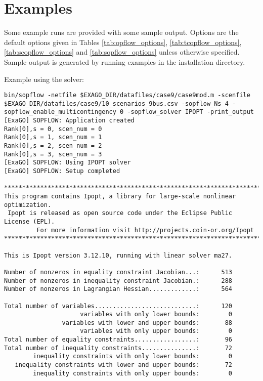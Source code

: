 \section{Examples}
Some \sopflow example runs are provided with some sample output. Options are the default options given in Tables \ref{tab:opflow_options}, \ref{tab:tcopflow_options}, \ref{tab:scopflow_options} and \ref{tab:sopflow_options} unless otherwise specified. Sample output is generated by running examples in the installation directory.

Example using the \ipopt solver:

\begin{lstlisting}
bin/sopflow -netfile $EXAGO_DIR/datafiles/case9/case9mod.m -scenfile $EXAGO_DIR/datafiles/case9/10_scenarios_9bus.csv -sopflow_Ns 4 -sopflow_enable_multicontingency 0 -sopflow_solver IPOPT -print_output
[ExaGO] SOPFLOW: Application created
Rank[0],s = 0, scen_num = 0
Rank[0],s = 1, scen_num = 1
Rank[0],s = 2, scen_num = 2
Rank[0],s = 3, scen_num = 3
[ExaGO] SOPFLOW: Using IPOPT solver
[ExaGO] SOPFLOW: Setup completed

******************************************************************************
This program contains Ipopt, a library for large-scale nonlinear optimization.
 Ipopt is released as open source code under the Eclipse Public License (EPL).
         For more information visit http://projects.coin-or.org/Ipopt
******************************************************************************

This is Ipopt version 3.12.10, running with linear solver ma27.

Number of nonzeros in equality constraint Jacobian...:      513
Number of nonzeros in inequality constraint Jacobian.:      288
Number of nonzeros in Lagrangian Hessian.............:      564

Total number of variables............................:      120
                     variables with only lower bounds:        0
                variables with lower and upper bounds:       88
                     variables with only upper bounds:        0
Total number of equality constraints.................:       96
Total number of inequality constraints...............:       72
        inequality constraints with only lower bounds:        0
   inequality constraints with lower and upper bounds:       72
        inequality constraints with only upper bounds:        0


\end{lstlisting}
